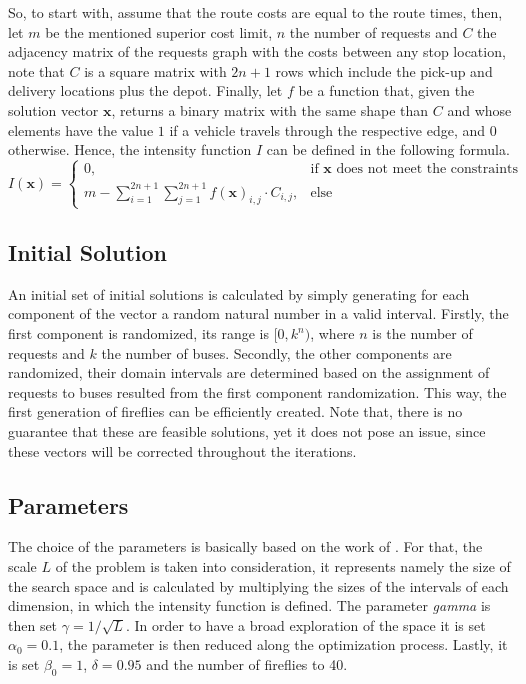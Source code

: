\documentclass[tuberlin,cic,tc,openright,english,noabntcite,oneside]{iiufrgs}
\begin{document}
So, to start with, assume that the route costs are equal to the route times, then, let $m$ be the mentioned superior cost limit, $n$ the number of requests and $C$ the adjacency matrix of the requests graph with the costs between any stop location, note that $C$ is a square matrix with $2n+1$ rows which include the pick-up and delivery locations plus the depot. Finally, let $f$ be a function that, given the solution vector $\mathbf{x}$, returns a binary matrix with the same shape than $C$ and whose elements have the value $1$ if a vehicle travels through the respective edge, and $0$ otherwise. Hence, the intensity function $I$ can be defined in the following formula.
$$I(\mathbf{x}) = \begin{cases} 0, & \text{if }\mathbf{x}\text{ does not meet the constraints}\\
								m - \displaystyle\sum_{i=1}^{2n+1}\sum_{j=1}^{2n+1} f(\mathbf{x})_{i,j} \cdot C_{i,j}, & \text{else}
					\end{cases}$$

\subsection{Initial Solution}
An initial set of initial solutions is calculated by simply generating for each component of the vector a random natural number in a valid interval. Firstly, the first component is randomized, its range is $[0, k^n)$, where $n$ is the number of requests and $k$ the number of buses. Secondly, the other components are randomized, their domain intervals are determined based on the assignment of requests to buses resulted from the first component randomization. This way, the first generation of fireflies can be efficiently created. Note that, there is no guarantee that these are feasible solutions, yet it does not pose an issue, since these vectors will be corrected throughout the iterations.

\subsection{Parameters}
The choice of the parameters is basically based on the work of \textcite[p. 37-38]{yang_firefly_2013}. For that, the scale $L$ of the problem is taken into consideration, it represents namely the size of the search space and is calculated by multiplying the sizes of the intervals of each dimension, in which the intensity function is defined. The parameter \emph{gamma} is then set $\gamma = 1/\sqrt{L}$. In order to have a broad exploration of the space it is set $\alpha_0 = 0.1$, the parameter is then reduced along the optimization process. Lastly, it is set $\beta_0 = 1$, $\delta = 0.95$ and the number of fireflies to 40.
\end{document}

